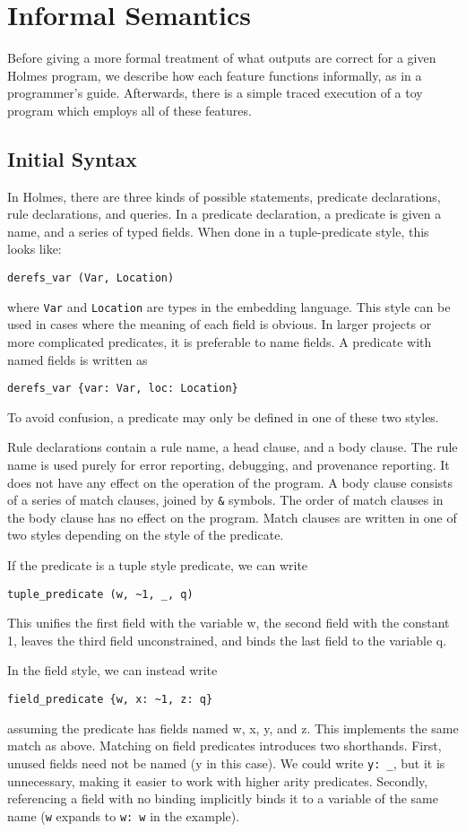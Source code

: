 \section{Informal Semantics}
Before giving a more formal treatment of what outputs are correct for a given Holmes program, we describe how each feature functions informally, as in a programmer's guide.
Afterwards, there is a simple traced execution of a toy program which employs all of these features.
\subsection{Initial Syntax}
In Holmes, there are three kinds of possible statements, predicate declarations, rule declarations, and queries.
In a predicate declaration, a predicate is given a name, and a series of typed fields.
When done in a tuple-predicate style, this looks like:
\begin{verbatim}
derefs_var (Var, Location)
\end{verbatim}
where \texttt{Var} and \texttt{Location} are types in the embedding language.
This style can be used in cases where the meaning of each field is obvious.
In larger projects or more complicated predicates, it is preferable to name fields.
A predicate with named fields is written as
\begin{verbatim}
derefs_var {var: Var, loc: Location}
\end{verbatim}
To avoid confusion, a predicate may only be defined in one of these two styles.

Rule declarations contain a rule name, a head clause, and a body clause.
The rule name is used purely for error reporting, debugging, and provenance reporting.
It does not have any effect on the operation of the program.
A body clause consists of a series of match clauses, joined by \texttt{\&} symbols.
The order of match clauses in the body clause has no effect on the program.
Match clauses are written in one of two styles depending on the style of the predicate.

If the predicate is a tuple style predicate, we can write
\begin{verbatim}
tuple_predicate (w, ~1, _, q)
\end{verbatim}
This unifies the first field with the variable w, the second field with the constant 1, leaves the third field unconstrained, and binds the last field to the variable q.

In the field style, we can instead write
\begin{verbatim}
field_predicate {w, x: ~1, z: q}
\end{verbatim}
assuming the predicate has fields named w, x, y, and z.
This implements the same match as above.
Matching on field predicates introduces two shorthands.
First, unused fields need not be named (y in this case).
We could write \texttt{y: \_}, but it is unnecessary, making it easier to work with higher arity predicates.
Secondly, referencing a field with no binding implicitly binds it to a variable of the same name (\texttt{w} expands to \texttt{w: w} in the example).

